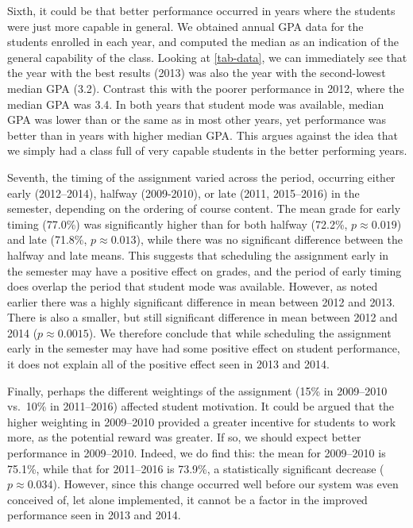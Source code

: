 \documentclass[sigconf, review, anonymous, capitalise]{acmart}
\begin{document}
Sixth, it could be that better performance occurred in years where the students were just more capable in general. We obtained annual GPA data for the students enrolled in each year, and computed the median as an indication of the general capability of the class. Looking at \cref{tab-data}, we can immediately see that the year with the best results (2013) was also the year with the second-lowest median GPA (3.2). Contrast this with the poorer performance in 2012, where the median GPA was 3.4. In both years that student mode was available, median GPA was lower than or the same as in most other years, yet performance was better than in years with higher median GPA. This argues against the idea that we simply had a class full of very capable students in the better performing years.

Seventh, the timing of the assignment varied across the period, occurring either early (2012--2014), halfway (2009-2010), or late (2011, 2015--2016) in the semester, depending on the ordering of course content. The mean grade for early timing (77.0\%) was significantly higher than for both halfway (72.2\%, \(p \approx 0.019\)) and late (71.8\%, \(p \approx 0.013\)), while there was no significant difference between the halfway and late means. This suggests that scheduling the assignment early in the semester may have a positive effect on grades, and the period of early timing does overlap the period that student mode was available. However, as noted earlier there was a highly significant difference in mean between 2012 and 2013. There is also a smaller, but still significant difference in mean between 2012 and 2014 (\(p \approx 0.0015\)). We therefore conclude that while scheduling the assignment early in the semester may have had some positive effect on student performance, it does not explain all of the positive effect seen in 2013 and 2014.

Finally, perhaps the different weightings of the assignment (15\% in 2009--2010 vs.\ 10\% in 2011--2016) affected student motivation. It could be argued that the higher weighting in 2009--2010 provided a greater incentive for students to work more, as the potential reward was greater. If so, we should expect better performance in 2009--2010. Indeed, we do find this: the mean for 2009--2010 is 75.1\%, while that for 2011--2016 is 73.9\%, a statistically significant decrease (\(p \approx 0.034\)). However, since this change occurred well before our system was even conceived of, let alone implemented, it cannot be a factor in the improved performance seen in 2013 and 2014.
\end{document}
